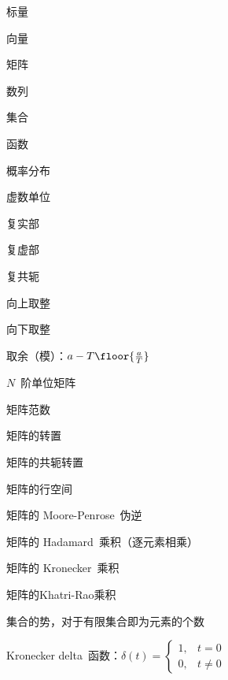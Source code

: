 
\item[{{$a, b, c, \ldots$}}] 标量
\item[{{$\vec{a}, \vec{b}, \vec{c}, \ldots$}}] 向量
\item[{{$\mat{A}, \mat{B}, \mat{C}, \ldots$}}] 矩阵
\item[{{$(a_i), (b_i), (c_i), \ldots$}}] 数列
\item[{{$\mathbb{Q}, \mathbb{R}, \mathbb{C}, \ldots$}}] 集合
\item[{{$f(x), g(x), h(x), \ldots$}}] 函数
\item[{{$\mathcal{D}, \mathcal{E}, \mathcal{F}, \ldots$}}] 概率分布

\item %

\item[{{$\im$}}] 虚数单位
\item[{{$\Re(x)$}}] 复实部
\item[{{$\Im(x)$}}] 复虚部 
\item[{{$\overline{x}$}}] 复共轭
\item[{{$\ceil{x}$}}] 向上取整 
\item[{{$\floor{x}$}}] 向下取整
\item[{{$x \bmod T$}}] 取余（模）：$a - T\floor{\frac{a}{T}}$
\item[{{$\mat{I}_{N}$}}] $N$~阶单位矩阵
\item[{{$\norm{\mat{A}}$}}] 矩阵范数
\item[{{$\mat{A}\tr$}}] 矩阵的转置
\item[{{$\mat{A}\ct$}}] 矩阵的共轭转置
\item[{{$\row(\mat{A})$}}] 矩阵的行空间
\item[{{$\mat{A}^\dagger$}}] 矩阵的 Moore-Penrose~伪逆
\item[{{$\mat{A}.*\mat{B}$}}] 矩阵的 Hadamard~乘积（逐元素相乘）
\item[{{$\mat{A}\otimes\mat{B}$}}] 矩阵的 Kronecker~乘积
\item[{{$\mat{A}\odot\mat{B}$}}] 矩阵的Khatri-Rao乘积
\item[{{$\#\mathbb{S}$}}] 集合的势，对于有限集合即为元素的个数
\item[{{$\delta(t)$}}] Kronecker delta~函数：$\delta(t) = \begin{cases}
    1, & t = 0 \\
    0, & t \neq 0
\end{cases}$
